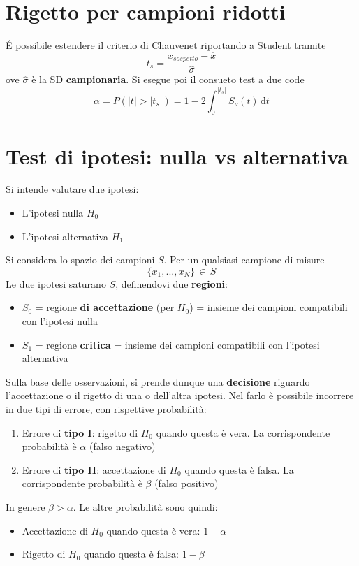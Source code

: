 \documentclass[10pt, oneside]{book}
\newcommand{\integral}[4]{\int_{#1}^{#2} #3 \, \mathrm{d}#4}
\begin{document}
\section{Rigetto per campioni ridotti}
\'E possibile estendere il criterio di Chauvenet riportando a Student tramite
\[t_s = \frac{x_{sospetto} - \overline{x}}{\hat{\sigma}}\]
ove $\hat{\sigma}$ è la SD \textbf{campionaria}. Si esegue poi il consueto test a due code
\[\alpha = P(|t| > |t_s|) = 1 - 2 \integral{0}{|t_s|}{S_\nu (t)}{t}\]

\section{Test di ipotesi: nulla vs alternativa}
Si intende valutare due ipotesi:
\begin{itemize}
\item L'ipotesi nulla $H_0$
\item L'ipotesi alternativa $H_1$
\end{itemize}
Si considera lo spazio dei campioni $S$. Per un qualsiasi campione di misure
\[\{x_1, ..., x_N\} \, \in \, S\]
Le due ipotesi saturano $S$, definendovi due \textbf{regioni}:
\begin{itemize}
\item $S_0$ = regione \textbf{di accettazione} (per $H_0$) = insieme dei campioni compatibili con l'ipotesi nulla
\item $S_1$ = regione \textbf{critica} = insieme dei campioni compatibili con l'ipotesi alternativa
\end{itemize}
Sulla base delle osservazioni, si prende dunque una \textbf{decisione} riguardo l'accettazione o il rigetto di una o dell'altra ipotesi. Nel farlo è possibile incorrere in due tipi di errore, con rispettive probabilità:
\begin{enumerate}
\item Errore di \textbf{tipo I}: rigetto di $H_0$ quando questa è vera. La corrispondente probabilità è $\alpha$ (falso negativo)
\item Errore di \textbf{tipo II}: accettazione di $H_0$ quando questa è falsa. La corrispondente probabilità è $\beta$ (falso positivo)
\end{enumerate}
In genere $\beta > \alpha$. Le altre probabilità sono quindi:
\begin{itemize}
\item Accettazione di $H_0$ quando questa è vera: $1-\alpha$
\item Rigetto di $H_0$ quando questa è falsa: $1 - \beta$
\end{itemize}
\end{document}
